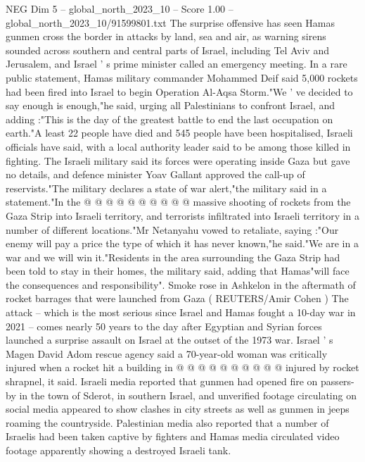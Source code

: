 \begin{textsample}{NEG Dim 5 – global\_north\_2023\_10 – Score 1.00 – global\_north\_2023\_10/91599801.txt}  \label{ex:f5_neg_027}
The surprise offensive has seen Hamas gunmen cross the border in attacks by land, sea and air, as warning sirens sounded across southern and central parts of Israel, including Tel Aviv and Jerusalem, and Israel ' s prime minister called an emergency meeting.
In a rare public statement, Hamas military commander Mohammed Deif said 5,000 rockets had been fired into Israel to begin Operation Al-Aqsa Storm."We ' ve decided to say enough is enough,"he said, urging all Palestinians to confront Israel, and adding :"This is the day of the greatest battle to end the last occupation on earth."A least 22 people have died and 545 people have been hospitalised, Israeli officials have said, with a local authority leader said to be among those killed in fighting.
The Israeli military said its forces were operating inside Gaza but gave no details, and defence minister Yoav Gallant approved the call-up of reservists."The military declares a state of war alert,"the military said in a statement."In the @ @ @ @ @ @ @ @ @ @ massive shooting of rockets from the Gaza Strip into Israeli territory, and terrorists infiltrated into Israeli territory in a number of different locations."Mr Netanyahu vowed to retaliate, saying :"Our enemy will pay a price the type of which it has never known,"he said."We are in a war and we will win it."Residents in the area surrounding the Gaza Strip had been told to stay in their homes, the military said, adding that Hamas"will face the consequences and responsibility".
Smoke rose in Ashkelon in the aftermath of rocket barrages that were launched from Gaza ( REUTERS/Amir Cohen ) The attack -- which is the most serious since Israel and Hamas fought a 10-day war in 2021 -- comes nearly 50 years to the day after Egyptian and Syrian forces launched a surprise assault on Israel at the outset of the 1973 war.
Israel ' s Magen David Adom rescue agency said a 70-year-old woman was critically injured when a rocket hit a building in @ @ @ @ @ @ @ @ @ @ injured by rocket shrapnel, it said.
Israeli media reported that gunmen had opened fire on passers-by in the town of Sderot, in southern Israel, and unverified footage circulating on social media appeared to show clashes in city streets as well as gunmen in jeeps roaming the countryside.
Palestinian media also reported that a number of Israelis had been taken captive by fighters and Hamas media circulated video footage apparently showing a destroyed Israeli tank.

\end{textsample}

